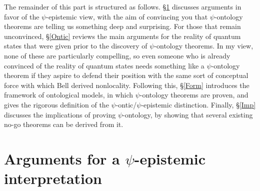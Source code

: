 \documentclass[DIV=calc,paper=a4,fontsize=11pt,twocolumn]{scrartcl} %
\theoremstyle{definition}
\theoremstyle{plain}
\begin{document}
The remainder of this part is structured as follows.  \S\ref{PsiEp}
discusses arguments in favor of the $\psi$-epistemic view, with the
aim of convincing you that $\psi$-ontology theorems are telling us
something deep and surprising.  For those that remain unconvinced,
\S\ref{Ontic} reviews the main arguments for the reality of quantum
states that were given prior to the discovery of $\psi$-ontology
theorems.  In my view, none of these are particularly compelling, so
even someone who is already convinced of the reality of quantum states
needs something like a $\psi$-ontology theorem if they aspire to
defend their position with the same sort of conceptual force with
which Bell derived nonlocality.  Following this, \S\ref{Form}
introduces the framework of ontological models, in which
$\psi$-ontology theorems are proven, and gives the rigorous definition
of the $\psi$-ontic/$\psi$-epistemic distinction.  Finally,
\S\ref{Imp} discusses the implications of proving $\psi$-ontology, by
showing that several existing no-go theorems can be derived from it.

\section{Arguments for a $\psi$-epistemic interpretation}

\label{PsiEp}
\end{document}
